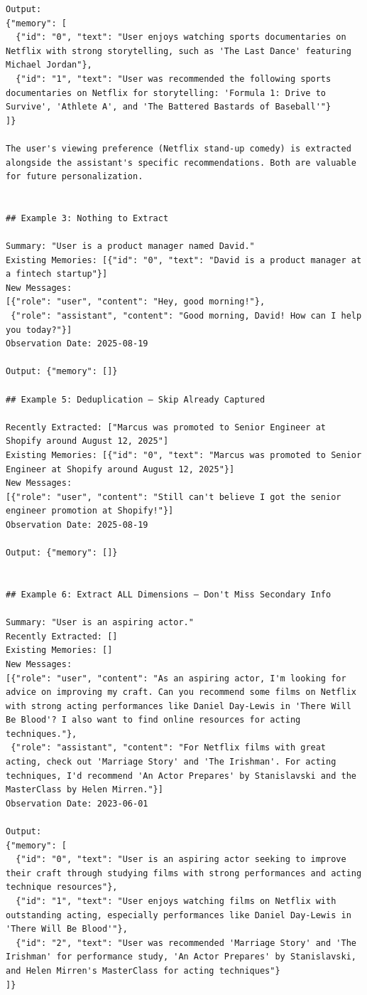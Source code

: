 \documentclass[11pt]{article}
\begin{document}
\begin{lstlisting}
Output:
{"memory": [
  {"id": "0", "text": "User enjoys watching sports documentaries on Netflix with strong storytelling, such as 'The Last Dance' featuring Michael Jordan"},
  {"id": "1", "text": "User was recommended the following sports documentaries on Netflix for storytelling: 'Formula 1: Drive to Survive', 'Athlete A', and 'The Battered Bastards of Baseball'"}
]}

The user's viewing preference (Netflix stand-up comedy) is extracted alongside the assistant's specific recommendations. Both are valuable for future personalization.


## Example 3: Nothing to Extract

Summary: "User is a product manager named David."
Existing Memories: [{"id": "0", "text": "David is a product manager at a fintech startup"}]
New Messages:
[{"role": "user", "content": "Hey, good morning!"},
 {"role": "assistant", "content": "Good morning, David! How can I help you today?"}]
Observation Date: 2025-08-19

Output: {"memory": []}

## Example 5: Deduplication — Skip Already Captured

Recently Extracted: ["Marcus was promoted to Senior Engineer at Shopify around August 12, 2025"]
Existing Memories: [{"id": "0", "text": "Marcus was promoted to Senior Engineer at Shopify around August 12, 2025"}]
New Messages:
[{"role": "user", "content": "Still can't believe I got the senior engineer promotion at Shopify!"}]
Observation Date: 2025-08-19

Output: {"memory": []}


## Example 6: Extract ALL Dimensions — Don't Miss Secondary Info

Summary: "User is an aspiring actor."
Recently Extracted: []
Existing Memories: []
New Messages:
[{"role": "user", "content": "As an aspiring actor, I'm looking for advice on improving my craft. Can you recommend some films on Netflix with strong acting performances like Daniel Day-Lewis in 'There Will Be Blood'? I also want to find online resources for acting techniques."},
 {"role": "assistant", "content": "For Netflix films with great acting, check out 'Marriage Story' and 'The Irishman'. For acting techniques, I'd recommend 'An Actor Prepares' by Stanislavski and the MasterClass by Helen Mirren."}]
Observation Date: 2023-06-01

Output:
{"memory": [
  {"id": "0", "text": "User is an aspiring actor seeking to improve their craft through studying films with strong performances and acting technique resources"},
  {"id": "1", "text": "User enjoys watching films on Netflix with outstanding acting, especially performances like Daniel Day-Lewis in 'There Will Be Blood'"},
  {"id": "2", "text": "User was recommended 'Marriage Story' and 'The Irishman' for performance study, 'An Actor Prepares' by Stanislavski, and Helen Mirren's MasterClass for acting techniques"}
]}


\end{lstlisting}
\end{document}
